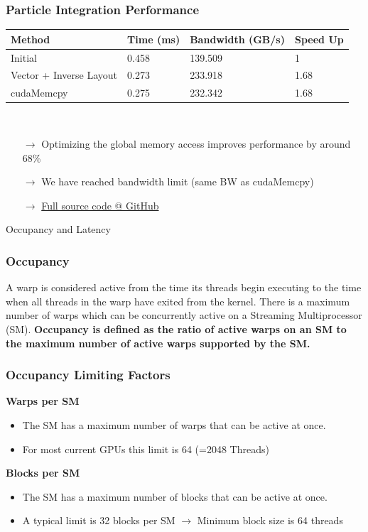 \documentclass[aspectratio=169,handout]{beamer}
\begin{document}
\begin{frame}[fragile]
\frametitle{Particle Integration Performance}
	\begin{tabular}{l|l|l|l}
	\textbf{Method} & \textbf{Time (ms)} & \textbf{Bandwidth (GB/s)} & \textbf{Speed Up} \\	
	\hline
	Initial & 0.458  & 139.509 & 1 \\
	Vector + Inverse Layout & 0.273  &       233.918 & 1.68 \\
	cudaMemcpy & 0.275   &    232.342 & 1.68  
\end{tabular}
\\
\vspace{0.5cm}
\begin{itemize}
	\item[$\rightarrow$] Optimizing the global memory access improves performance by around 68\%
	\item[$\rightarrow$] We have reached bandwidth limit (same BW as cudaMemcpy)
	\item[$\rightarrow$] \href{https://github.com/darglein/saiga/blob/master/samples/cuda/globalMemory/main.cu}{Full source code @ GitHub}
\end{itemize}
\end{frame}


\frame
{
\begin{center}
\Large Occupancy and Latency
\end{center}
}


\begin{frame}[fragile]
\frametitle{Occupancy}

	\begin{mdframed}[frametitle={CUDA Programming Guide}]
A warp is considered active from the time its threads begin executing to the time when all threads in the warp have exited from the kernel. There is a maximum number of warps which can be concurrently active on a Streaming Multiprocessor (SM). \textbf{Occupancy is defined as the ratio of active warps on an SM to the maximum number of active warps supported by the SM.}
\end{mdframed}
\end{frame}


\begin{frame}[fragile]
\frametitle{Occupancy Limiting Factors}
\textbf{Warps per SM}
\begin{itemize}
	\item The SM has a maximum number of warps that can be active at once. 
	\item For most current GPUs this limit is 64 (=2048 Threads)
\end{itemize}

\textbf{Blocks per SM}
\begin{itemize}
	\item The SM has a maximum number of blocks that can be active at once.
	\item A typical limit is 32 blocks per SM $\rightarrow$ Minimum block size is 64 threads
\end{itemize}		
\end{frame}
\end{document}
